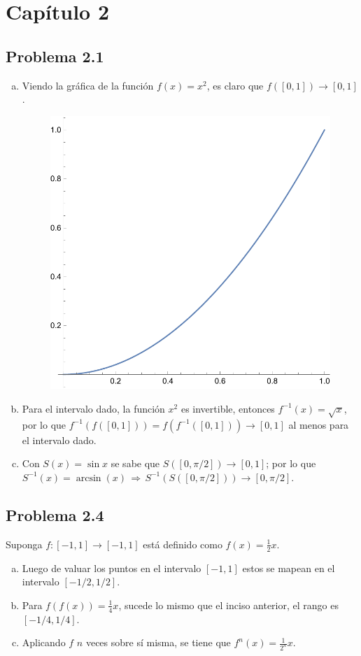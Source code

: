 \documentclass[conference]{IEEEtran}
\begin{document}
\section{Capítulo 2}

\subsection{Problema 2.1}
\begin{enumerate}[a)]
	\item Viendo la gráfica de la función $f(x) = x^2$, es claro que $f([0,1]) \to [0,1]$.
		\begin{figure}[H]
			\centering
			\includegraphics[scale=0.35]{./img/p2-1}
		\end{figure}
	\item Para el intervalo dado, la función $x^2$ es invertible, entonces $f^{-1}(x) = \sqrt{x}$, por lo que $f^{-1} (f([0,1])) = f(f^{-1}([0,1])) \to [0,1]$ al menos para el intervalo dado.
	\item Con $S(x) = \sin{x}$ se sabe que $S([0,\pi /2]) \to [0,1]$; por lo que $S^{-1} (x) = \arcsin(x) \, \Rightarrow \, S^{-1} (S([0,\pi /2])) \to [0,\pi /2]$.
\end{enumerate}




\subsection{Problema 2.4}
Suponga $f:[-1,1]\to [-1,1]$ está definido como $f(x) = \frac{1}{2} x$.
\begin{enumerate}[a)]
	\item Luego de valuar los puntos en el intervalo $[-1,1]$ estos se mapean en el intervalo $[-1/2,1/2]$.
	\item Para $f(f(x)) = \frac{1}{4} x$, sucede lo mismo que el inciso anterior, el rango es $[-1/4,1/4]$.
	\item Aplicando $f$ $n$ veces sobre sí misma, se tiene que $f^n (x) = \frac{1}{2^n} x$.
\end{enumerate}
\end{document}
